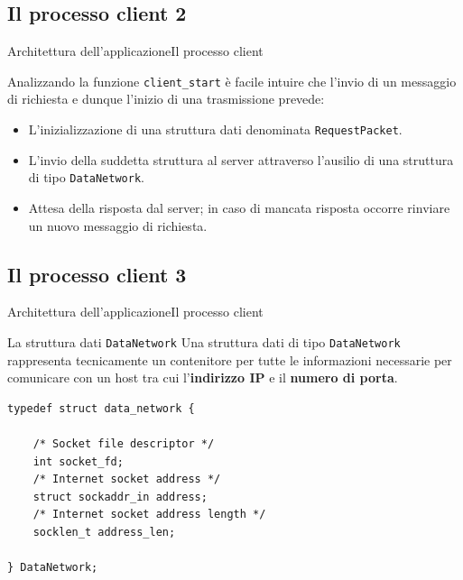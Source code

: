 \documentclass[10pt]{beamer}
\begin{document}
\subsection{Il processo client 2}
\begin{frame}[fragile]{Architettura dell'applicazione}{Il processo client}

Analizzando la funzione \texttt{client\_start} è facile intuire che l'invio di un messaggio di richiesta e dunque l'inizio di una trasmissione prevede:

\begin{itemize}
\item L'inizializzazione di una struttura dati denominata \texttt{RequestPacket}.
\item L'invio della suddetta struttura al server attraverso l'ausilio di una struttura di tipo \texttt{DataNetwork}.
\item Attesa della risposta dal server; in caso di mancata risposta occorre rinviare un nuovo messaggio di richiesta.
\end{itemize}



\end{frame}



\subsection{Il processo client 3}
\begin{frame}[fragile]{Architettura dell'applicazione}{Il processo client}

\begin{block}{La struttura dati \texttt{DataNetwork}}
Una struttura dati di tipo \texttt{DataNetwork} rappresenta tecnicamente un contenitore per tutte le informazioni necessarie per comunicare con un host tra cui l'\textbf{indirizzo IP} e il \textbf{numero di porta}. 
\end{block}

\begin{lstlisting}[frame=lines, caption={Implementazione della struttura \texttt{DataNetwork}}]
typedef struct data_network {

	/* Socket file descriptor */
	int socket_fd;
	/* Internet socket address */
	struct sockaddr_in address;
	/* Internet socket address length */
	socklen_t address_len;

} DataNetwork;

\end{lstlisting}
\end{frame}
\end{document}
